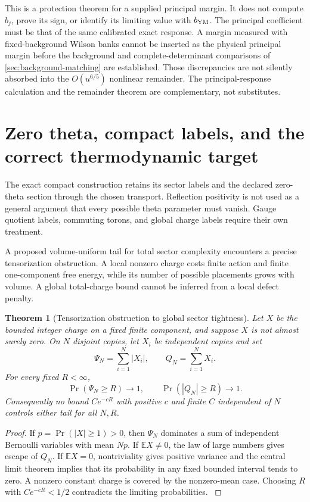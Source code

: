 \documentclass[11pt,oneside,openany]{book}
\newtheorem{theorem}{Theorem}[chapter]
\theoremstyle{definition}
\theoremstyle{remark}
\newcommand{\E}{\mathbb E}
\newcommand{\src}[2]{\cite[#2]{#1}}
\begin{document}
This is a protection theorem for a supplied principal margin. It does
not compute $b_j$, prove its sign, or identify its limiting value with
$b_{\rm YM}$. The principal coefficient must be that of the same calibrated
exact response. A margin measured with fixed-background Wilson banks
cannot be inserted as the physical principal margin before the background
and complete-determinant comparisons of \cref{sec:background-matching}
are established. Those discrepancies are not silently absorbed into the
$O(u^{6/5})$ nonlinear remainder. The principal-response calculation and the
remainder theorem are complementary, not substitutes.

\section{Zero theta, compact labels, and the correct thermodynamic target}
The exact compact construction retains its sector labels and the declared zero-theta section through the chosen transport. Reflection positivity is not used as a general argument that every possible theta parameter must vanish. Gauge quotient labels, commuting torons, and global charge labels require their own treatment.

A proposed volume-uniform tail for total sector complexity encounters a precise tensorization obstruction. A local nonzero charge costs finite action and finite one-component free energy, while its number of possible placements grows with volume. A global total-charge bound cannot be inferred from a local defect penalty.

\begin{theorem}[Tensorization obstruction to global sector tightness]\label{thm:sector-no-go}
Let $X$ be the bounded integer charge on a fixed finite component, and suppose $X$ is not almost surely zero. On $N$ disjoint copies, let $X_i$ be independent copies and set
\[
\Psi_N=\sum_{i=1}^N|X_i|,\qquad Q_N=\sum_{i=1}^NX_i.
\]
For every fixed $R<\infty$,
\begin{equation}\label{eq:sector-escape}
\Pr(\Psi_N\ge R)\longrightarrow1,\qquad
\Pr(|Q_N|\ge R)\longrightarrow1.
\end{equation}
Consequently no bound $Ce^{-cR}$ with positive $c$ and finite $C$ independent of $N$ controls either tail for all $N,R$.
\end{theorem}
\begin{proof}
If $p=\Pr(|X|\ge1)>0$, then $\Psi_N$ dominates a sum of independent Bernoulli variables with mean $Np$. If $\E X\ne0$, the law of large numbers gives escape of $Q_N$. If $\E X=0$, nontriviality gives positive variance and the central limit theorem implies that its probability in any fixed bounded interval tends to zero. A nonzero constant charge is covered by the nonzero-mean case. Choosing $R$ with $Ce^{-cR}<1/2$ contradicts the limiting probabilities. \src{PAR}{V5}
\end{proof}
\end{document}
